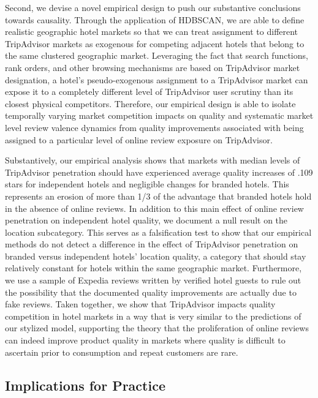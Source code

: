 \documentclass[mksc,blindrev]{informs3} %
\begin{document}
Second, we devise a novel empirical design to push our substantive conclusions towards causality. Through the application of HDBSCAN, we are able to define realistic geographic hotel markets so that we can treat assignment to different TripAdvisor markets as exogenous for competing adjacent hotels that belong to the same clustered geographic market. Leveraging the fact that search functions, rank orders, and other browsing mechanisms are based on TripAdvisor market designation, a hotel's pseudo-exogenous assignment to a TripAdvisor market can expose it to a completely different level of TripAdvisor user scrutiny than its closest physical competitors. Therefore, our empirical design is able to isolate temporally varying market competition impacts on quality and systematic market level review valence dynamics from quality improvements associated with being assigned to a particular level of online review exposure on TripAdvisor.

Substantively, our empirical analysis shows that markets with median levels of TripAdvisor penetration should have experienced average quality increases of .109 stars for independent hotels and negligible changes for branded hotels. This represents an erosion of more than 1/3 of the advantage that branded hotels hold in the absence of online reviews. In addition to this main effect of online review penetration on independent hotel quality, we document a null result on the location subcategory. This serves as a falsification test to show that our empirical methods do not detect a difference in the effect of TripAdvisor penetration on branded versus independent hotels' location quality, a category that should stay relatively constant for hotels within the same geographic market. Furthermore, we use a sample of Expedia reviews written by verified hotel guests to rule out the possibility that the documented quality improvements are actually due to fake reviews. Taken together, we show that TripAdvisor impacts quality competition in hotel markets in a way that is very similar to the predictions of our stylized model, supporting the theory that the proliferation of online reviews can indeed improve product quality in markets where quality is difficult to ascertain prior to consumption and repeat customers are rare. 

\subsection{Implications for Practice}
\end{document}

